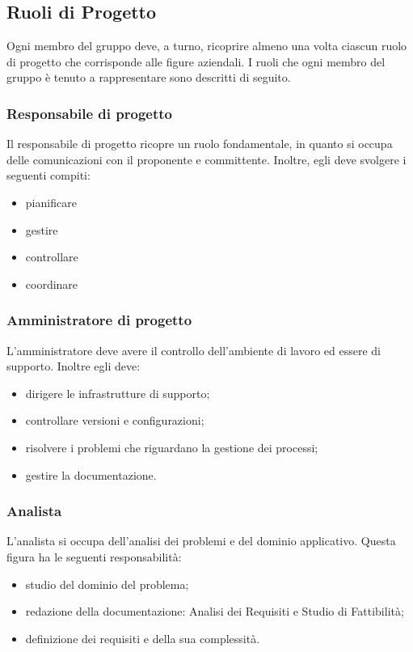 \subsection{Ruoli di Progetto}
Ogni membro del gruppo deve, a turno, ricoprire almeno una volta ciascun ruolo di progetto che corrisponde alle figure aziendali. I ruoli che ogni membro del gruppo è tenuto a rappresentare sono descritti di seguito.



\subsubsection{Responsabile di progetto}
Il responsabile di progetto ricopre un ruolo fondamentale, in quanto si occupa delle comunicazioni con il proponente e committente. Inoltre, egli deve svolgere i seguenti compiti:
\begin{itemize}
\item pianificare
\item gestire
\item controllare
\item coordinare
\end{itemize}

\subsubsection{Amministratore di progetto}
L'amministratore deve avere il controllo dell'ambiente di lavoro ed essere di supporto. Inoltre egli deve: 
\begin{itemize}
\item dirigere le infrastrutture di supporto;
\item controllare versioni e configurazioni;
\item risolvere i problemi che riguardano la gestione dei processi;
\item gestire la documentazione.
\end{itemize}


\subsubsection{Analista}
L'analista si occupa dell'analisi dei problemi e del dominio applicativo. Questa figura ha le seguenti responsabilità:
\begin{itemize}
\item studio del dominio del problema; 
\item redazione della documentazione: Analisi dei Requisiti e Studio di Fattibilità;
\item definizione dei requisiti e della sua complessità.
\end{itemize}
